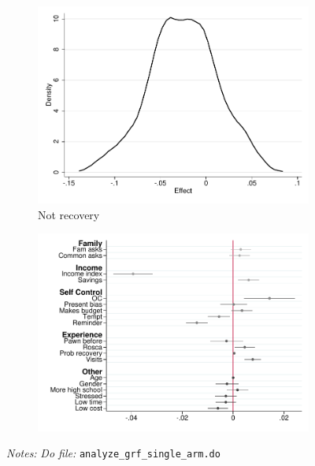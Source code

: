 \documentclass[11pt]{article}
\begin{document}
\begin{figure}[H]
\begin{center}
    \begin{subfigure}{0.4\textwidth}
        \caption{Not recovery}
        \centering
        \includegraphics[width=\textwidth]{Figuras/he_dist_def_c_pro_4.pdf}
    \end{subfigure}
    \begin{subfigure}{0.4\textwidth}
        \caption*{}
        \centering
        \includegraphics[width=\textwidth]{Figuras/HE/he_int_vertical_def_c_pro_4.pdf}
    \end{subfigure}
    \end{center}
     \footnotesize \textit{Notes: } 
      \footnotesize{ \textit{Do file: }  \texttt{analyze\_grf\_single\_arm.do}}
\end{figure}
\end{document}
